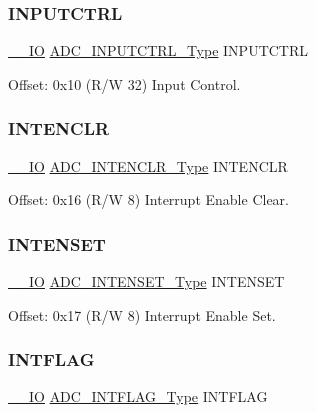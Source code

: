 \subsubsection{\texorpdfstring{INPUTCTRL}{INPUTCTRL}}
{\footnotesize\ttfamily \mbox{\hyperlink{core__cm0plus_8h_aec43007d9998a0a0e01faede4133d6be}{\+\_\+\+\_\+\+IO}} \mbox{\hyperlink{union_a_d_c___i_n_p_u_t_c_t_r_l___type}{A\+D\+C\+\_\+\+I\+N\+P\+U\+T\+C\+T\+R\+L\+\_\+\+Type}} I\+N\+P\+U\+T\+C\+T\+RL}



Offset\+: 0x10 (R/W 32) Input Control. 

\mbox{\label{struct_adc_ae5329d06e9488447c6d1b5483bc23adf}} 
\subsubsection{\texorpdfstring{INTENCLR}{INTENCLR}}
{\footnotesize\ttfamily \mbox{\hyperlink{core__cm0plus_8h_aec43007d9998a0a0e01faede4133d6be}{\+\_\+\+\_\+\+IO}} \mbox{\hyperlink{union_a_d_c___i_n_t_e_n_c_l_r___type}{A\+D\+C\+\_\+\+I\+N\+T\+E\+N\+C\+L\+R\+\_\+\+Type}} I\+N\+T\+E\+N\+C\+LR}



Offset\+: 0x16 (R/W 8) Interrupt Enable Clear. 

\mbox{\label{struct_adc_a8fb7d4296ddd8c0f80dad362e6b7b7a2}} 
\subsubsection{\texorpdfstring{INTENSET}{INTENSET}}
{\footnotesize\ttfamily \mbox{\hyperlink{core__cm0plus_8h_aec43007d9998a0a0e01faede4133d6be}{\+\_\+\+\_\+\+IO}} \mbox{\hyperlink{union_a_d_c___i_n_t_e_n_s_e_t___type}{A\+D\+C\+\_\+\+I\+N\+T\+E\+N\+S\+E\+T\+\_\+\+Type}} I\+N\+T\+E\+N\+S\+ET}



Offset\+: 0x17 (R/W 8) Interrupt Enable Set. 

\mbox{\label{struct_adc_a136020ff8e9f992bd4d76e268c5d8b73}} 
\subsubsection{\texorpdfstring{INTFLAG}{INTFLAG}}
{\footnotesize\ttfamily \mbox{\hyperlink{core__cm0plus_8h_aec43007d9998a0a0e01faede4133d6be}{\+\_\+\+\_\+\+IO}} \mbox{\hyperlink{union_a_d_c___i_n_t_f_l_a_g___type}{A\+D\+C\+\_\+\+I\+N\+T\+F\+L\+A\+G\+\_\+\+Type}} I\+N\+T\+F\+L\+AG}



